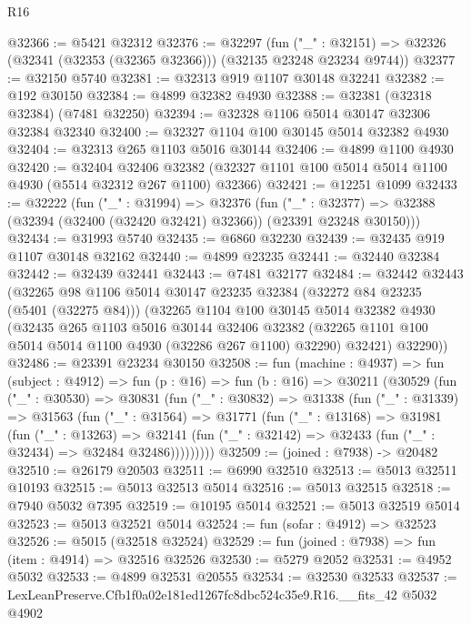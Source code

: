 \begin{lexlean}{R16}
\begin{coremodule}
@32366 := @5421 @32312
@32376 := @32297
    (fun ("_" : @32151) => @32326 (@32341 (@32353 (@32365 @32366))) (@32135 @23248 @23234 @9744))
@32377 := @32150 @5740
@32381 := @32313 @919 @1107 @30148 @32241
@32382 := @192 @30150
@32384 := @4899 @32382 @4930
@32388 := @32381 (@32318 @32384) (@7481 @32250)
@32394 := @32328 @1106 @5014 @30147 @32306 @32384 @32340
@32400 := @32327 @1104 @100 @30145 @5014 @32382 @4930
@32404 := @32313 @265 @1103 @5016 @30144
@32406 := @4899 @1100 @4930
@32420 := @32404
    @32406
    @32382
    (@32327 @1101 @100 @5014 @5014 @1100 @4930 (@5514 @32312 @267 @1100) @32366)
@32421 := @12251 @1099
@32433 := @32222
    (fun ("_" : @31994) =>
    @32376
      (fun ("_" : @32377) =>
      @32388 (@32394 (@32400 (@32420 @32421) @32366)) (@23391 @23248 @30150)))
@32434 := @31993 @5740
@32435 := @6860 @32230
@32439 := @32435 @919 @1107 @30148 @32162
@32440 := @4899 @23235
@32441 := @32440 @32384
@32442 := @32439 @32441
@32443 := @7481 @32177
@32484 := @32442
    @32443
    (@32265
      @98
      @1106
      @5014
      @30147
      @23235
      @32384
      (@32272 @84 @23235 (@5401 (@32275 @84)))
      (@32265
        @1104
        @100
        @30145
        @5014
        @32382
        @4930
        (@32435
          @265
          @1103
          @5016
          @30144
          @32406
          @32382
          (@32265 @1101 @100 @5014 @5014 @1100 @4930 (@32286 @267 @1100) @32290)
          @32421)
        @32290))
@32486 := @23391 @23234 @30150
@32508 := fun (machine : @4937) =>
  fun (subject : @4912) =>
  fun (p : @16) =>
  fun (b : @16) =>
  @30211
    (@30529
      (fun ("_" : @30530) =>
      @30831
        (fun ("_" : @30832) =>
        @31338
          (fun ("_" : @31339) =>
          @31563
            (fun ("_" : @31564) =>
            @31771
              (fun ("_" : @13168) =>
              @31981
                (fun ("_" : @13263) =>
                @32141 (fun ("_" : @32142) => @32433 (fun ("_" : @32434) => @32484 @32486)))))))))
@32509 := (joined : @7938) -> @20482
@32510 := @26179 @20503
@32511 := @6990 @32510
@32513 := @5013 @32511 @10193
@32515 := @5013 @32513 @5014
@32516 := @5013 @32515
@32518 := @7940 @5032 @7395
@32519 := @10195 @5014
@32521 := @5013 @32519 @5014
@32523 := @5013 @32521 @5014
@32524 := fun (sofar : @4912) => @32523
@32526 := @5015 (@32518 @32524)
@32529 := fun (joined : @7938) => fun (item : @4914) => @32516 @32526
@32530 := @5279 @2052
@32531 := @4952 @5032
@32533 := @4899 @32531 @20555
@32534 := @32530 @32533
@32537 := LexLeanPreserve.Cfb1f0a02e181ed1267fc8dbc524c35e9.R16.__fits_42 @5032 @4902

\end{coremodule}
\end{lexlean}
